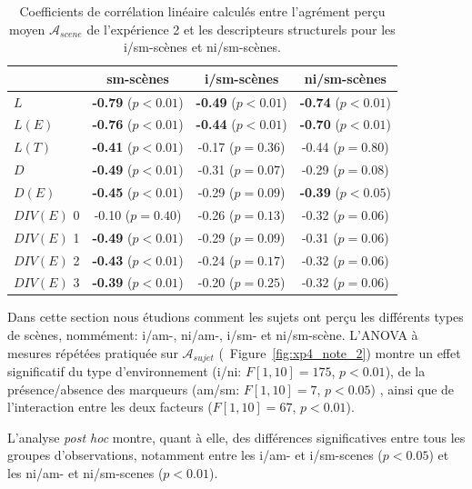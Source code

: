 \begin{table}[t]
\centering
\begin{tabular}{l c c c} 
               & sm-scènes                    & i/sm-scènes                & ni/sm-scènes    \\
\hline
$L$            & \textbf{-0.79} ($p<0.01$)    & \textbf{-0.49} ($p<0.01$)  & \textbf{-0.74} ($p<0.01$)\\
$L(E)$         & \textbf{-0.76} ($p<0.01$)    & \textbf{-0.44} ($p<0.01$)  & \textbf{-0.70} ($p<0.01$)\\
$L(T)$         & \textbf{-0.41} ($p<0.01$)    & -0.17 ($p=0.36$)           & -0.44 ($p=0.80$) \\
$D$            & \textbf{-0.49} ($p<0.01$)    & -0.31 ($p=0.07$)           & -0.29 ($p=0.08$)\\
$D(E)$         & \textbf{-0.45} ($p<0.01$)    & -0.29 ($p=0.09$)           & \textbf{-0.39} ($p<0.05$)\\
$DIV(E)$ 0     &         -0.10  ($p=0.40$)    & -0.26 ($p=0.13$)           & -0.32 ($p=0.06$)\\
$DIV(E)$ 1     & \textbf{-0.49} ($p<0.01$)    & -0.29 ($p=0.09$)           & -0.31 ($p=0.06$)\\
$DIV(E)$ 2     & \textbf{-0.43} ($p<0.01$)    & -0.24 ($p=0.17$)           & -0.32 ($p=0.06$)\\
$DIV(E)$ 3     & \textbf{-0.39} ($p<0.01$)    & -0.20 ($p=0.25$)           & -0.32 ($p=0.06$)\\
\hline
\end{tabular}
\vspace{0.5mm}
\caption{Coefficients de corrélation linéaire calculés entre l'agrément perçu moyen $\mathcal{A}_{scene}$ de l'expérience 2 et les descripteurs structurels pour les i/sm-scènes et ni/sm-scènes.}
\label{tab:corrSmXP4}
\end{table}

Dans cette section nous étudions comment les sujets ont perçu les différents types de scènes, nommément: i/am-, ni/am-, i/sm- et ni/sm-scène. L'ANOVA à mesures répétées pratiquée sur $\mathcal{A}_{sujet}$ (\cf~Figure~\ref{fig:xp4_note_2}) montre un effet significatif du type d'environnement (i/ni: $F[1,10]=175$, $p<0.01$), de la présence/absence des marqueurs (am/sm: $F[1,10]=7$, $p<0.05$) , ainsi que de l'interaction entre les deux facteurs ($F[1,10]=67$, $p<0.01$).

L'analyse \emph{post hoc} montre, quant à elle, des différences significatives entre tous les groupes d'observations, notamment entre les i/am- et i/sm-scenes ($p<0.05$) et les ni/am- et ni/sm-scenes ($p<0.01$).

